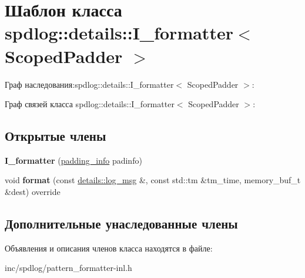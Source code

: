 \hypertarget{classspdlog_1_1details_1_1I__formatter}{}\section{Шаблон класса spdlog\+:\+:details\+:\+:I\+\_\+formatter$<$ Scoped\+Padder $>$}
\label{classspdlog_1_1details_1_1I__formatter}


Граф наследования\+:spdlog\+:\+:details\+:\+:I\+\_\+formatter$<$ Scoped\+Padder $>$\+:


Граф связей класса spdlog\+:\+:details\+:\+:I\+\_\+formatter$<$ Scoped\+Padder $>$\+:
\subsection*{Открытые члены}
\begin{DoxyCompactItemize}
\item 
\mbox{\label{classspdlog_1_1details_1_1I__formatter_a11ce76cd8a5e465884c33503e58365a2}} 
{\bfseries I\+\_\+formatter} (\hyperlink{structspdlog_1_1details_1_1padding__info}{padding\+\_\+info} padinfo)
\item 
\mbox{\label{classspdlog_1_1details_1_1I__formatter_afde3bcb8c4949fb413a0a106072b897d}} 
void {\bfseries format} (const \hyperlink{structspdlog_1_1details_1_1log__msg}{details\+::log\+\_\+msg} \&, const std\+::tm \&tm\+\_\+time, memory\+\_\+buf\+\_\+t \&dest) override
\end{DoxyCompactItemize}
\subsection*{Дополнительные унаследованные члены}


Объявления и описания членов класса находятся в файле\+:\begin{DoxyCompactItemize}
\item 
inc/spdlog/pattern\+\_\+formatter-\/inl.\+h\end{DoxyCompactItemize}
